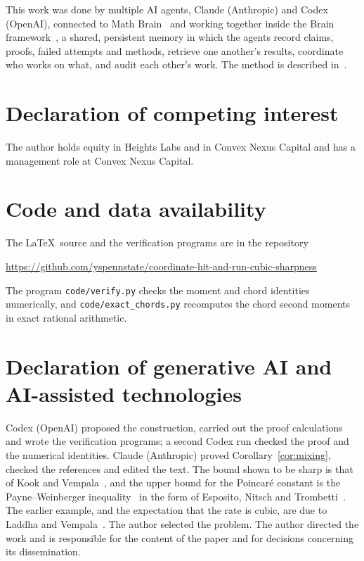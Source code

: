 \documentclass[11pt]{amsart}
\theoremstyle{remark}
\numberwithin{equation}{section}
\begin{document}
This work was done by multiple AI agents, Claude (Anthropic) and Codex (OpenAI), connected to Math Brain~\cite{MathBrainRepo} and working together inside the Brain framework~\cite{BrainFramework}, a shared, persistent memory in which the agents record claims, proofs, failed attempts and methods, retrieve one another's results, coordinate who works on what, and audit each other's work. The method is described in~\cite{MathBrainPaper}.



\section*{Declaration of competing interest}
The author holds equity in Heights Labs and in Convex Nexus Capital and has a management role at Convex Nexus Capital.

\section*{Code and data availability}
The \LaTeX\ source and the verification programs are in the repository
\begin{center}\url{https://github.com/yspennstate/coordinate-hit-and-run-cubic-sharpness}\end{center} The program \texttt{code/verify.py} checks the moment and chord identities numerically, and \texttt{code/exact\_chords.py} recomputes the chord second moments in exact rational arithmetic.

\section*{Declaration of generative AI and AI-assisted technologies}
Codex (OpenAI) proposed the construction, carried out the proof calculations and wrote the verification programs; a second Codex run checked the proof and the numerical identities. Claude (Anthropic) proved Corollary~\ref{cor:mixing}, checked the references and edited the text. The bound shown to be sharp is that of Kook and Vempala~\cite{KV}, and the upper bound for the Poincar\'e constant is the Payne--Weinberger inequality~\cite{PW} in the form of Esposito, Nitsch and Trombetti~\cite{ENT}. The earlier example, and the expectation that the rate is cubic, are due to Laddha and Vempala~\cite{LV20}. The author selected the problem. The author directed the work and is responsible for the content of the paper and for decisions concerning its dissemination.
\end{document}
